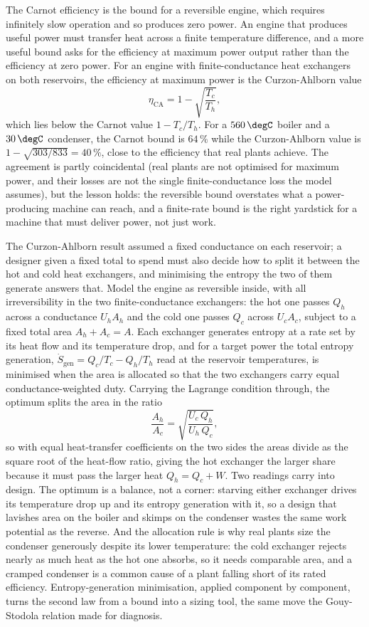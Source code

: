 \begin{mastery}
The Carnot efficiency is the bound for a reversible engine, which
requires infinitely slow operation and so produces zero power. An
engine that produces useful power must transfer heat across a finite
temperature difference, and a more useful bound asks for the efficiency
at maximum power output rather than the efficiency at zero power. For an
engine with finite-conductance heat exchangers on both reservoirs, the
efficiency at maximum power is the Curzon-Ahlborn value
\[
\eta_{\text{CA}} = 1 - \sqrt{\frac{T_c}{T_h}},
\]
which lies below the Carnot value $1 - T_c/T_h$. For a $560\,\degC$
boiler and a $30\,\degC$ condenser, the Carnot bound is $64\,\%$ while
the Curzon-Ahlborn value is $1 - \sqrt{303/833} = 40\,\%$, close to the
efficiency that real plants achieve. The agreement is partly
coincidental (real plants are not optimised for maximum power, and their
losses are not the single finite-conductance loss the model assumes),
but the lesson holds: the reversible bound overstates what a
power-producing machine can reach, and a finite-rate bound is the right
yardstick for a machine that must deliver power, not just work.
\end{mastery}

\begin{mastery}
The Curzon-Ahlborn result assumed a fixed conductance on each reservoir; a
designer given a fixed total to spend must also decide how to split it between the
hot and cold heat exchangers, and minimising the entropy the two of them generate
answers that. Model the engine as reversible inside, with all irreversibility in
the two finite-conductance exchangers: the hot one passes $Q_h$ across a
conductance $U_h A_h$ and the cold one passes $Q_c$ across $U_c A_c$, subject to a
fixed total area $A_h + A_c = A$. Each exchanger generates entropy at a rate set by
its heat flow and its temperature drop, and for a target power the total entropy
generation, $\dot S_{\text{gen}} = Q_c/T_c - Q_h/T_h$ read at the reservoir
temperatures, is minimised when the area is allocated so that the two exchangers
carry equal conductance-weighted duty. Carrying the Lagrange condition through, the
optimum splits the area in the ratio
\[
\frac{A_h}{A_c} = \sqrt{\frac{U_c\,Q_h}{U_h\,Q_c}},
\]
so with equal heat-transfer coefficients on the two sides the areas divide as the
square root of the heat-flow ratio, giving the hot exchanger the larger share
because it must pass the larger heat $Q_h = Q_c + W$. Two readings carry into
design. The optimum is a balance, not a corner: starving either exchanger drives
its temperature drop up and its entropy generation with it, so a design that
lavishes area on the boiler and skimps on the condenser wastes the same work
potential as the reverse. And the allocation rule is why real plants size the
condenser generously despite its lower temperature: the cold exchanger rejects
nearly as much heat as the hot one absorbs, so it needs comparable area, and a
cramped condenser is a common cause of a plant falling short of its rated
efficiency. Entropy-generation minimisation, applied component by component, turns
the second law from a bound into a sizing tool, the same move the Gouy-Stodola
relation made for diagnosis.
\end{mastery}

